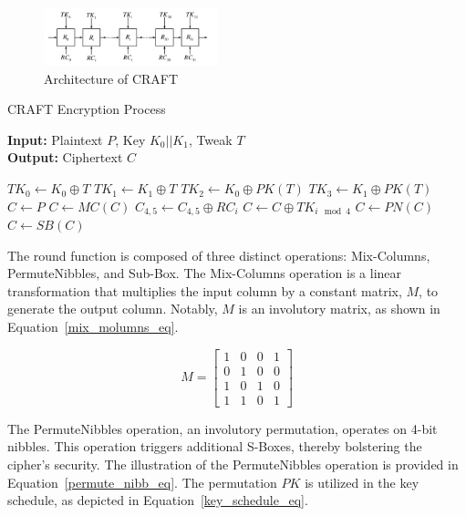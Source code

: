 \documentclass[final,5p,times,twocolumn]{elsarticle}
\begin{document}
\begin{figure}[h]%
    \centering
    \includegraphics[width=0.45\textwidth]{./fig/struct-craft.pdf}
    \caption{Architecture of CRAFT}\label{fig1}
\end{figure}

\begin{algorithm}[h]
    \caption{CRAFT Encryption Process}\label{alg1}
    \textbf{Input:} Plaintext $P$, Key $K_0||K_1$, Tweak $T$ \\
    \textbf{Output:} Ciphertext $C$
    \begin{algorithmic}[1]
        \State $TK_0 \gets K_0\oplus T$
        \State $TK_1 \gets K_1\oplus T$
        \State $TK_2 \gets K_0\oplus PK(T)$
        \State $TK_3 \gets K_1\oplus PK(T)$
        \State $C \gets P$
        \State $C \gets MC(C)$
        \State $C_{4,5} \gets C_{4,5}\oplus RC_i$
        \State $C \gets C \oplus TK_{i\mod 4}$
        \State $C \gets PN(C)$
        \State $C \gets SB(C)$
        \EndIf
        \EndFor
    \end{algorithmic}
\end{algorithm}

The round function is composed of three distinct operations: Mix-Columns, PermuteNibbles, and Sub-Box.
The Mix-Columns operation is a linear transformation that multiplies the input column by a constant matrix, $M$, to generate the output column. Notably, $M$ is an involutory matrix, as shown in Equation~\ref{mix_molumns_eq}.


\begin{equation}
    M =
    \begin{bmatrix}
        1 & 0 & 0 & 1 \\
        0 & 1 & 0 & 0 \\
        1 & 0 & 1 & 0 \\
        1 & 1 & 0 & 1
    \end{bmatrix}
    \label{mix_molumns_eq}
\end{equation}

The PermuteNibbles operation, an involutory permutation, operates on 4-bit nibbles. This operation triggers additional S-Boxes, thereby bolstering the cipher's security. The illustration of the PermuteNibbles operation is provided in Equation~\ref{permute_nibb_eq}. The permutation $PK$ is utilized in the key schedule, as depicted in Equation~\ref{key_schedule_eq}.
\end{document}
